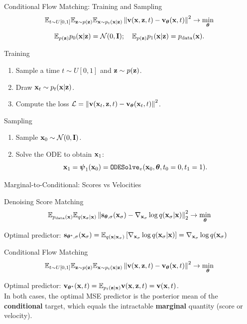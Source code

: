 \documentclass{beamer}
\begin{document}
\begin{frame}{Conditional Flow Matching: Training and Sampling}
	\[
		\mathbb{E}_{t \sim U[0, 1]} \mathbb{E}_{\mathbf{z} \sim p(\mathbf{z})} \mathbb{E}_{\mathbf{x} \sim p_t(\mathbf{x} | \mathbf{z})}\left\| \mathbf{v}(\mathbf{x}, \mathbf{z}, t) - \mathbf{v}_{\boldsymbol{\theta}}(\mathbf{x}, t) \right\|^2 \rightarrow \min_{\boldsymbol{\theta}}
	\]
	\[
		\mathbb{E}_{p(\mathbf{z})} p_0(\mathbf{x} | \mathbf{z}) = \mathcal{N}(0, \mathbf{I}); \quad \mathbb{E}_{p(\mathbf{z})} p_1(\mathbf{x} | \mathbf{z}) = p_{\text{data}}(\mathbf{x}).
	\]
	\eqpause
	\vspace{-0.3cm}
	\begin{block}{Training}
		\begin{enumerate}
			\item Sample a time $t \sim U[0, 1]$ and $\mathbf{z} \sim p(\mathbf{z})$.
			\item Draw $\mathbf{x}_t \sim p_t(\mathbf{x} | \mathbf{z})$.
			\item Compute the loss $ \mathcal{L} = \left\| \mathbf{v}(\mathbf{x}_t, \mathbf{z}, t) - \mathbf{v}_{\boldsymbol{\theta}}(\mathbf{x}_t, t) \right\|^2 $.
		\end{enumerate}
	\end{block}
	\eqpause
	\begin{block}{Sampling}
		\begin{enumerate}
			\item Sample $\mathbf{x}_0 \sim \mathcal{N}(0, \mathbf{I})$.
			\item Solve the ODE to obtain $\mathbf{x}_1$:
			\[
				\mathbf{x}_1 = \boldsymbol{\psi}_1(\mathbf{x}_0) = \texttt{ODESolve}_v(\mathbf{x}_0, \boldsymbol{\theta}, t_0=0, t_1=1).
			\]
		\end{enumerate}
	\end{block}
\end{frame}
\begin{frame}{Marginal-to-Conditional: Scores vs Velocities}
	\begin{block}{Denoising Score Matching}
		\vspace{-0.3cm}
		\[
			\mathbb{E}_{p_{\text{data}}(\mathbf{x})} \mathbb{E}_{q(\mathbf{x}_{\sigma} | \mathbf{x})}\left\| \mathbf{s}_{\boldsymbol{\theta}, \sigma}(\mathbf{x}_{\sigma}) - \nabla_{\mathbf{x}_{\sigma}} \log q(\mathbf{x}_{\sigma} | \mathbf{x}) \right\|_2^2 \rightarrow \min_{\boldsymbol{\theta}}
		\]
		\vspace{-0.3cm}
	\end{block}
	Optimal predictor: $\mathbf{s}_{\boldsymbol{\theta}^*, \sigma}(\mathbf{x}_\sigma) = \mathbb{E}_{q(\mathbf{x} | \mathbf{x}_\sigma)} \left[\nabla_{\mathbf{x}_\sigma} \log q(\mathbf{x}_\sigma | \mathbf{x}) \right] = \nabla_{\mathbf{x}_\sigma} \log q(\mathbf{x}_\sigma)$
	\eqpause
	\begin{block}{Conditional Flow Matching}
		\vspace{-0.3cm}
		\[
			\mathbb{E}_{t \sim U[0, 1]} \mathbb{E}_{\mathbf{z} \sim p(\mathbf{z})} \mathbb{E}_{\mathbf{x} \sim p_t(\mathbf{x} | \mathbf{z})}\left\| \mathbf{v}(\mathbf{x}, \mathbf{z}, t) - \mathbf{v}_{\boldsymbol{\theta}}(\mathbf{x}, t) \right\|^2 \rightarrow \min_{\boldsymbol{\theta}}
		\]
		\vspace{-0.3cm}
	\end{block}
	Optimal predictor: $\mathbf{v}_{\boldsymbol{\theta}^*}(\mathbf{x}, t) = \mathbb{E}_{p_t(\mathbf{z} | \mathbf{x})} \mathbf{v}(\mathbf{x}, \mathbf{z}, t) = \mathbf{v}(\mathbf{x}, t)$. \\
	\eqpause
	\vspace{0.2cm}
	In both cases, the optimal MSE predictor is the posterior mean of the \textbf{conditional} target, which equals the intractable \textbf{marginal} quantity (score or velocity).
\end{frame}
\end{document}
